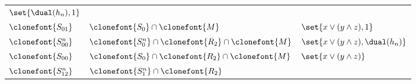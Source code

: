 \documentclass[11pt]{article}
\begin{document}
\begin{figure}[hbtp]
\begin{small}
\begin{longtable}[]{p{}p{}p{}}
\begin{minipage}[t]{0.38\columnwidth}
                \(\set{\dual(h_n), 1}\)\strut
            \end{minipage}\tabularnewline
            \begin{minipage}[t]{0.12\columnwidth}\raggedright
                \(\clonefont{S_{01}}\)\strut
            \end{minipage} & \begin{minipage}[t]{0.41\columnwidth}\raggedright
                \(\clonefont{S_0} \cap \clonefont{M}\)\strut
            \end{minipage} & \begin{minipage}[t]{0.38\columnwidth}\raggedright
                \(\set{x \lor (y \land z), 1}\)\strut
            \end{minipage}\tabularnewline
            \begin{minipage}[t]{0.12\columnwidth}\raggedright
                \(\clonefont{S_{00}^n}\)\strut
            \end{minipage} & \begin{minipage}[t]{0.41\columnwidth}\raggedright
                \(\clonefont{S_0^n} \cap \clonefont{R_2} \cap \clonefont{M}\)\strut
            \end{minipage} & \begin{minipage}[t]{0.38\columnwidth}\raggedright
                \(\set{x \lor (y \land z), \dual(h_n)}\)\strut
            \end{minipage}\tabularnewline
            \begin{minipage}[t]{0.12\columnwidth}\raggedright
                \(\clonefont{S_{00}}\)\strut
            \end{minipage} & \begin{minipage}[t]{0.41\columnwidth}\raggedright
                \(\clonefont{S_0} \cap \clonefont{R_2} \cap \clonefont{M}\)\strut
            \end{minipage} & \begin{minipage}[t]{0.38\columnwidth}\raggedright
                \(\set{x \lor (y \land z)}\)\strut
            \end{minipage}\tabularnewline
            \begin{minipage}[t]{0.12\columnwidth}\raggedright
                \(\clonefont{S_{12}^n}\)\strut
            \end{minipage} & \begin{minipage}[t]{0.41\columnwidth}\raggedright
                \(\clonefont{S_1^n} \cap \clonefont{R_2}\)\strut
            \end{minipage} & \begin{minipage}[t]{0.38\columnwidth}\raggedright

\end{minipage}
\end{longtable}
\end{small}
\end{figure}
\end{document}
